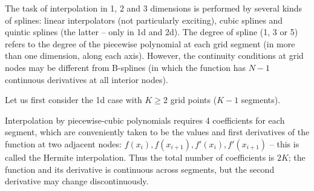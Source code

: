 \documentclass[12pt]{article}
\begin{document}
The task of interpolation in 1, 2 and 3 dimensions is performed by several kinds of splines: linear interpolators (not particularly exciting), cubic splines and quintic splines (the latter -- only in 1d and 2d). The degree of spline (1, 3 or 5) refers to the degree of the piecewise polynomial at each grid segment (in more than one dimension, along each axis). However, the continuity conditions at grid nodes may be different from B-splines (in which the function has $N-1$ continuous derivatives at all interior nodes).

Let us first consider the 1d case with $K\ge 2$ grid points ($K-1$ segments).

Interpolation by piecewise-cubic polynomials requires 4 coefficients for each segment, which are conveniently taken to be the values and first derivatives of the function at two adjacent nodes: $f(x_i), f(x_{i+1}), f'(x_i), f'(x_{i+1})$ -- this is called the Hermite interpolation. Thus the total number of coefficients is $2K$; the function and its derivative is continuous across segments, but the second derivative may change discontinuously.
\end{document}
